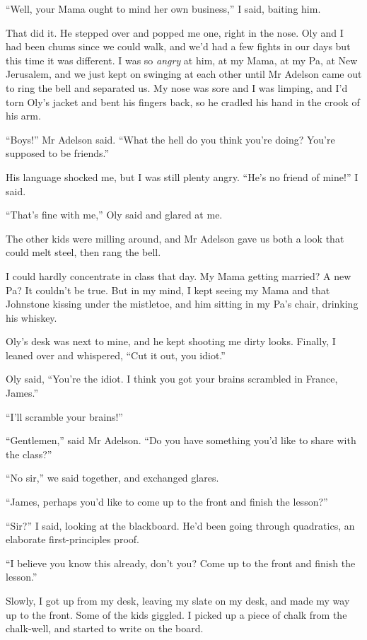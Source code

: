 ``Well, your Mama ought to mind her own business,'' I said, baiting
him.

That did it. He stepped over and popped me one, right in the nose.
Oly and I had been chums since we could walk, and we'd had a few
fights in our days but this time it was different. I was so
\emph{angry} at him, at my Mama, at my Pa, at New Jerusalem, and we
just kept on swinging at each other until Mr Adelson came out to
ring the bell and separated us. My nose was sore and I was limping,
and I'd torn Oly's jacket and bent his fingers back, so he cradled
his hand in the crook of his arm.

``Boys!'' Mr Adelson said.
``What the hell do you think you're doing? You're supposed to be friends.''

His language shocked me, but I was still plenty angry.
``He's no friend of mine!'' I said.

``That's fine with me,'' Oly said and glared at me.

The other kids were milling around, and Mr Adelson gave us both a
look that could melt steel, then rang the bell.

\tb

I could hardly concentrate in class that day. My Mama getting
married? A new Pa? It couldn't be true. But in my mind, I kept
seeing my Mama and that Johnstone kissing under the mistletoe, and
him sitting in my Pa's chair, drinking his whiskey.

Oly's desk was next to mine, and he kept shooting me dirty looks.
Finally, I leaned over and whispered, ``Cut it out, you idiot.''

Oly said,
``You're the idiot. I think you got your brains scrambled in France, James.''

``I'll scramble your brains!''

``Gentlemen,'' said Mr Adelson.
``Do you have something you'd like to share with the class?''

``No sir,'' we said together, and exchanged glares.

``James, perhaps you'd like to come up to the front and finish the lesson?''

``Sir?'' I said, looking at the blackboard. He'd been going through
quadratics, an elaborate first-principles proof.

``I believe you know this already, don't you? Come up to the front and finish 
the lesson.''

Slowly, I got up from my desk, leaving my slate on my desk, and
made my way up to the front. Some of the kids giggled. I picked up
a piece of chalk from the chalk-well, and started to write on the
board.

